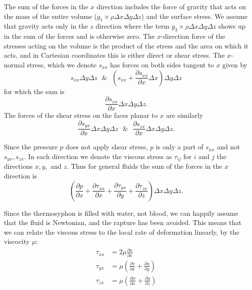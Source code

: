 \documentclass[12pt]{report}
\begin{document}
The sum of the forces in the $x$ direction includes the force of gravity that acts on the mass of the entire volume ($g_1 \times \rho \Delta x\Delta y \Delta z$) and the surface stress.
We assume that gravity acts only in the $z$ direction where the term $g_3 \times \rho \Delta x \Delta y \Delta z$ shows up in the sum of the forces and is otherwise zero.
The $x$-direction force of the stresses acting on the volume is the product of the stress and the area on which it acts, and in Cartesian coordinates this is either direct or shear stress.
The $x$-normal stress, which we denote $s_{xx}$ has forces on both sides tangent to $x$ given by
\begin{equation*} s_{xx} \Delta y \Delta z ~~~\& ~~~ \left ( s_{xx} + \frac{\partial s_{xx} }{\partial x} \Delta x \right ) \Delta y \Delta z \end{equation*}
for which the sum is
\begin{equation*} \frac{\partial s_{xx} }{\partial x} \Delta x \Delta y \Delta z .\end{equation*}
The forces of the shear stress on the faces planar to $x$ are similarly
\begin{equation*} \frac{\partial s_{yx} }{\partial x} \Delta x \Delta y \Delta z ~~~\&~~~\frac{\partial s_{zx} }{\partial x} \Delta x \Delta y \Delta z .\end{equation*} 

Since the pressure $p$ does not apply shear stress, $p$ is only a part of $s_{xx}$ and not $s_{yx},s_{zx}$.
In each direction we denote the viscous stress as $\tau _{ij}$ for $i$ and $j$ the directions $x,y,$ and $z$.
Thus for general fluids the sum of the forces in the $x$ direction is
\begin{equation*} \left ( \frac{\partial p }{\partial x} + \frac{\partial \tau _{xx}}{\partial x} + \frac{\partial \tau _{yx}}{\partial y} + \frac{\partial \tau _{zx}}{\partial z} \right ) \Delta x \Delta y \Delta z . \end{equation*}

Since the thermosyphon is filled with water, not blood, we can happily assume that the fluid is Newtonian, and the rapture has been avoided.
This means that we can relate the viscous stress to the local rate of deformation linearly, by the viscocity $\mu$:
\begin{align*} \tau _{xx} &= 2 \mu \frac{\partial u}{\partial x} \\
\tau _{yx} &= \mu \left ( \frac{\partial v}{\partial x} + \frac{\partial u}{\partial y} \right )\\
\tau _{zx} &= \mu \left ( \frac{\partial w}{\partial x} + \frac{\partial u}{\partial z} \right )\end{align*}
\end{document}
